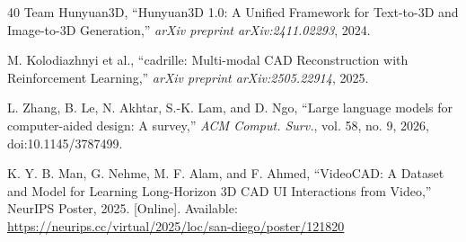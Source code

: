 \documentclass[conference]{IEEEtran}
\begin{document}
\begin{thebibliography}{40}
Team Hunyuan3D, ``Hunyuan3D 1.0: A Unified Framework for Text-to-3D and Image-to-3D Generation,'' \emph{arXiv preprint arXiv:2411.02293}, 2024.

M. Kolodiazhnyi et al., ``cadrille: Multi-modal CAD Reconstruction with Reinforcement Learning,'' \emph{arXiv preprint arXiv:2505.22914}, 2025.

L. Zhang, B. Le, N. Akhtar, S.-K. Lam, and D. Ngo, ``Large language models for computer-aided design: A survey,'' \emph{ACM Comput. Surv.}, vol. 58, no. 9, 2026, doi:10.1145/3787499.

K. Y. B. Man, G. Nehme, M. F. Alam, and F. Ahmed, ``VideoCAD: A Dataset and Model for Learning Long-Horizon 3D CAD UI Interactions from Video,'' NeurIPS Poster, 2025. [Online]. Available: \url{https://neurips.cc/virtual/2025/loc/san-diego/poster/121820}

\end{thebibliography}

\clearpage
\onecolumn
\appendices
\end{document}
